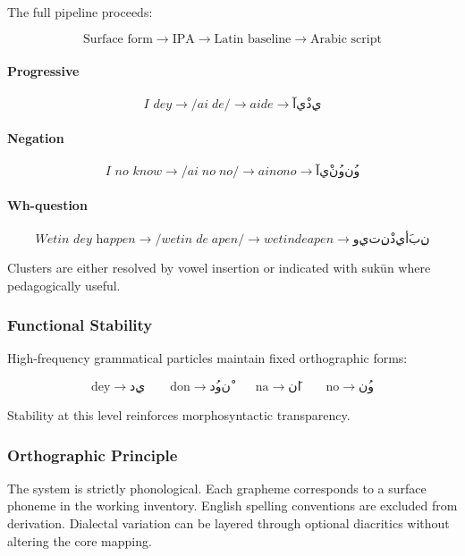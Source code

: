 \documentclass[12pt]{article}
\begin{document}
The full pipeline proceeds:

\[
\text{Surface form} \rightarrow \text{IPA} \rightarrow \text{Latin baseline} \rightarrow \text{Arabic script}
\]

\paragraph{Progressive}

\[
\textit{I dey} \rightarrow /ai\; de/ \rightarrow ai de \rightarrow آيْ دِي
\]

\paragraph{Negation}

\[
\textit{I no know} \rightarrow /ai\; no\; no/ \rightarrow ai no no \rightarrow آيْ نُو نُو
\]

\paragraph{Wh-question}

\[
\textit{Wetin dey happen} \rightarrow /wetin\; de\; apen/ \rightarrow wetin de apen
\rightarrow وِيتِنْ دِي أَبِن
\]

Clusters are either resolved by vowel insertion or indicated with sukūn where pedagogically useful.

\subsubsection{Functional Stability}

High-frequency grammatical particles maintain fixed orthographic forms:

\[
\text{dey} \rightarrow دِي \qquad
\text{don} \rightarrow دُونْ \qquad
\text{na} \rightarrow نَا \qquad
\text{no} \rightarrow نُو
\]

Stability at this level reinforces morphosyntactic transparency.

\subsubsection{Orthographic Principle}

The system is strictly phonological. Each grapheme corresponds to a surface phoneme in the working inventory. English spelling conventions are excluded from derivation. Dialectal variation can be layered through optional diacritics without altering the core mapping.
\end{document}

